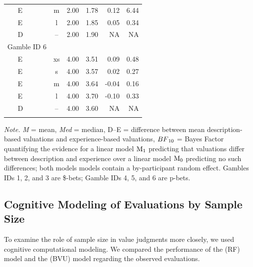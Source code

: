 \documentclass[a4paper, man, floatsintext]{apa6}
\begin{document}
\begin{table}[tbp]
\begin{center}
\begin{threeparttable}
\begin{tabular}{lcccrr}
\ \ \ E & m & 2.00 & 1.78 & 0.12 & 6.44\\
\ \ \ E & l & 2.00 & 1.85 & 0.05 & 0.34\\
\ \ \ D & -- & 2.00 & 1.90 & NA & NA\\
Gamble ID 6 &  &  &  &  & \\
\ \ \ E & xs & 4.00 & 3.51 & 0.09 & 0.48\\
\ \ \ E & s & 4.00 & 3.57 & 0.02 & 0.27\\
\ \ \ E & m & 4.00 & 3.64 & -0.04 & 0.16\\
\ \ \ E & l & 4.00 & 3.70 & -0.10 & 0.33\\
\ \ \ D & -- & 4.00 & 3.60 & NA & NA\\
\bottomrule
\addlinespace
\end{tabular}
\begin{tablenotes}[para]
\normalsize{\textit{Note.} \textit{M} = mean, \textit{Med} = median, D--E = difference between mean description-based valuations and experience-based valuations, $BF\textsubscript{10}$ = Bayes Factor quantifying the evidence for a linear model $\mathrm{M}\textsubscript{1}$ predicting that valuations differ between description and experience over a linear model $\mathrm{M}\textsubscript{0}$ predicting no such differences; both models models contain a by-participant random effect. Gambles IDs 1, 2, and 3 are \$-bets; Gamble IDs 4, 5, and 6 are p-bets.}
\end{tablenotes}
\end{threeparttable}
\end{center}
\end{table}

\subsection{Cognitive Modeling of Evaluations by Sample Size}

To examine the role of sample size in value judgments more closely, we
used cognitive computational modeling. We compared the performance of
the  (RF) model and the
 (BVU) model regarding the observed
evaluations.
\end{document}
